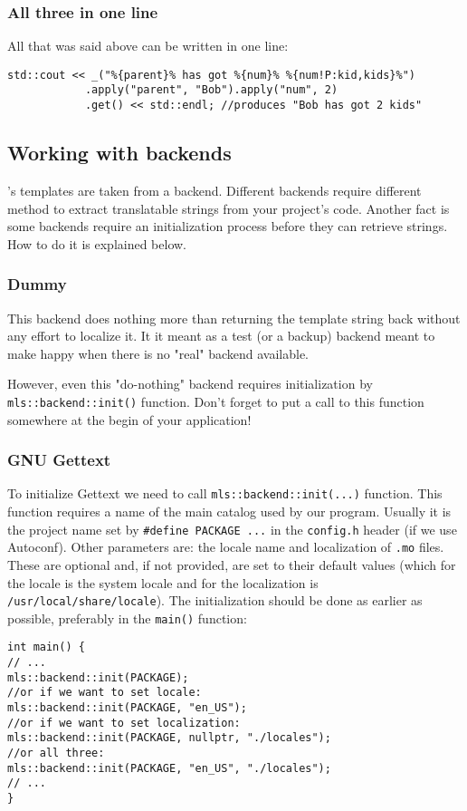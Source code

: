 \subsubsection{All three in one line}
All that was said above can be written in one line:
\begin{verbatim}
std::cout << _("%{parent}% has got %{num}% %{num!P:kid,kids}%")
			.apply("parent", "Bob").apply("num", 2)
			.get() << std::endl; //produces "Bob has got 2 kids"
\end{verbatim}

\subsection{Working with backends}
\mulan{}'s templates are taken from a backend. Different backends require different method to extract translatable strings from your project's code.
Another fact is some backends require an initialization process before they can retrieve strings. How to do it is explained below.

\subsubsection{Dummy}
This backend does nothing more than returning the template string back without any effort to localize it. 
It it meant as a test (or a backup) backend meant to make \mulan{} happy when there is no "real" backend available.

However, even this "do-nothing" backend requires initialization by \verb+mls::backend::init()+ function. Don't forget to put a call to this function 
somewhere at the begin of your application!

\subsubsection{GNU Gettext}
To initialize Gettext we need to call \verb+mls::backend::init(...)+ function. 
This function requires a name of the main catalog used by our program. Usually it is the project name set by \verb+#define PACKAGE ...+ in the \texttt{config.h} header (if we use Autoconf).
Other parameters are: the locale name and localization of \texttt{.mo} files. These are optional and, if not provided, are set to their default values (which for the locale is the system locale 
and for the localization is \texttt{/usr/local/share/locale}). The initialization should be done as earlier as possible, preferably in the \verb+main()+ function:
\begin{verbatim}
int main() {
// ...
mls::backend::init(PACKAGE);
//or if we want to set locale:
mls::backend::init(PACKAGE, "en_US");
//or if we want to set localization:
mls::backend::init(PACKAGE, nullptr, "./locales");
//or all three:
mls::backend::init(PACKAGE, "en_US", "./locales");
// ...
}
\end{verbatim}

